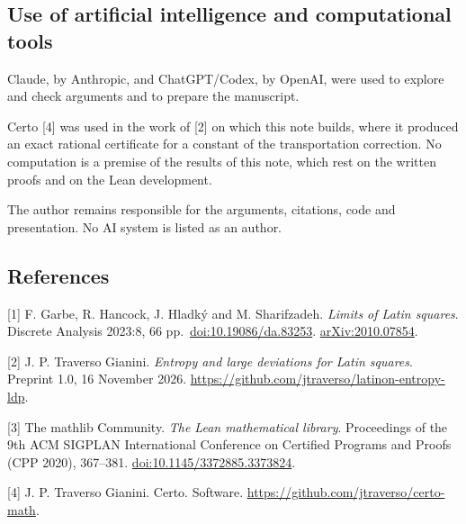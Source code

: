 \documentclass[english,11pt,a4paper]{article}
\begin{document}
\subsection{Use of artificial intelligence and computational tools}\label{use-of-artificial-intelligence-and-computational-tools}

Claude, by Anthropic, and ChatGPT/Codex, by OpenAI, were used to explore and check arguments and to prepare the manuscript.

Certo {[}4{]} was used in the work of {[}2{]} on which this note builds, where it produced an exact rational certificate for a constant of the transportation correction. No computation is a premise of the results of this note, which rest on the written proofs and on the Lean development.

The author remains responsible for the arguments, citations, code and presentation. No AI system is listed as an author.

\subsection{References}\label{references}
\begingroup\small

{[}1{]} F. Garbe, R. Hancock, J. Hladký and M. Sharifzadeh. \emph{Limits of Latin squares}. Discrete Analysis 2023:8, 66 pp.~\href{https://doi.org/10.19086/da.83253}{doi:10.19086/da.83253}. \href{https://arxiv.org/abs/2010.07854}{arXiv:2010.07854}.

{[}2{]} J. P. Traverso Gianini. \emph{Entropy and large deviations for Latin squares}. Preprint 1.0, 16 November 2026. \url{https://github.com/jtraverso/latinon-entropy-ldp}.

{[}3{]} The mathlib Community. \emph{The Lean mathematical library}. Proceedings of the 9th ACM SIGPLAN International Conference on Certified Programs and Proofs (CPP 2020), 367--381. \href{https://doi.org/10.1145/3372885.3373824}{doi:10.1145/3372885.3373824}.

{[}4{]} J. P. Traverso Gianini. Certo. Software. \url{https://github.com/jtraverso/certo-math}.

\endgroup
\end{document}
